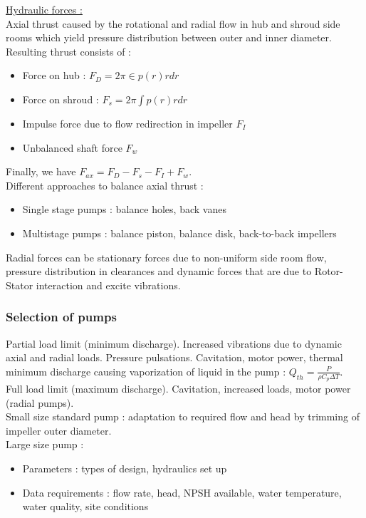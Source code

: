 \documentclass[../main.tex]{subfiles}
\begin{document}
\quad \underline{Hydraulic forces :}\\
Axial thrust caused by the rotational and radial flow in hub and shroud side rooms which yield pressure distribution between outer and inner diameter. Resulting thrust consists of : \begin{itemize}
    \item Force on hub : $F_D = 2\pi \in p(r)rdr$
    \item Force on shroud : $F_s = 2\pi \int p(r)rdr$
    \item Impulse force due to flow redirection in impeller $F_I$
    \item Unbalanced shaft force $F_w$
\end{itemize}
Finally, we have $F_{ax} = F_D - F_s - F_I + F_w$.\\
Different approaches to balance axial thrust : \begin{itemize}
    \item Single stage pumps : balance holes, back vanes
    \item Multistage pumps : balance piston, balance disk, back-to-back impellers
\end{itemize}

Radial forces can be stationary forces due to non-uniform side room flow, pressure distribution in clearances and dynamic forces that are due to Rotor-Stator interaction and excite vibrations. 

\subsubsection{Selection of pumps}
Partial load limit (minimum discharge). Increased vibrations due to dynamic axial and radial loads. Pressure pulsations. Cavitation, motor power, thermal minimum discharge causing vaporization of liquid in the pump : $Q_{th} = \frac{P}{\rho C_p \Delta T}$.\\
Full load limit (maximum discharge). Cavitation, increased loads, motor power (radial pumps).\\

Small size standard pump : adaptation to required flow and head by trimming of impeller outer diameter.\\

Large size pump : \begin{itemize}
    \item Parameters : types of design, hydraulics set up
    \item Data requirements : flow rate, head, NPSH available, water temperature, water quality, site conditions
\end{itemize}
\end{document}
